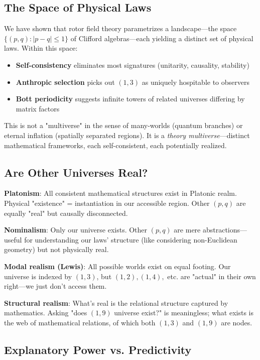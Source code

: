 \documentclass[11pt,a4paper]{article}
\numberwithin{equation}{section}
\theoremstyle{plain}
\theoremstyle{definition}
\theoremstyle{remark}
\begin{document}
\subsection{The Space of Physical Laws}

We have shown that rotor field theory parametrizes a landscape—the space $\{(p,q) : |p-q| \leq 1\}$ of Clifford algebras—each yielding a distinct set of physical laws. Within this space:

\begin{itemize}
\item \textbf{Self-consistency} eliminates most signatures (unitarity, causality, stability)
\item \textbf{Anthropic selection} picks out $(1,3)$ as uniquely hospitable to observers
\item \textbf{Bott periodicity} suggests infinite towers of related universes differing by matrix factors
\end{itemize}

This is not a "multiverse" in the sense of many-worlds (quantum branches) or eternal inflation (spatially separated regions). It is a \emph{theory multiverse}—distinct mathematical frameworks, each self-consistent, each potentially realized.

\subsection{Are Other Universes Real?}

\textbf{Platonism}: All consistent mathematical structures exist in Platonic realm. Physical "existence" = instantiation in our accessible region. Other $(p,q)$ are equally "real" but causally disconnected.

\textbf{Nominalism}: Only our universe exists. Other $(p,q)$ are mere abstractions—useful for understanding our laws' structure (like considering non-Euclidean geometry) but not physically real.

\textbf{Modal realism (Lewis)}: All possible worlds exist on equal footing. Our universe is indexed by $(1,3)$, but $(1,2), (1,4),$ etc. are "actual" in their own right—we just don't access them.

\textbf{Structural realism}: What's real is the relational structure captured by mathematics. Asking "does $(1,9)$ universe exist?" is meaningless; what exists is the web of mathematical relations, of which both $(1,3)$ and $(1,9)$ are nodes.

\subsection{Explanatory Power vs. Predictivity}
\end{document}
